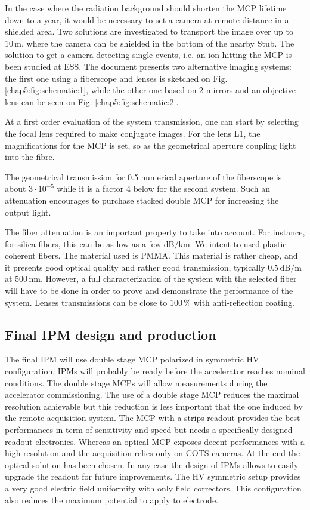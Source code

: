 In the case where the radiation background should shorten the MCP lifetime down to a year, it would be necessary to set a camera at remote distance in a shielded area. Two solutions are investigated to transport the image over up to $10\,\mathrm{m}$, where the camera can be shielded in the bottom of the nearby Stub. The solution to get a camera detecting single events, i.e. an ion hitting the MCP is been studied at ESS. The document presents two alternative imaging systems: the first one using a fiberscope and lenses is sketched on Fig. \ref{chap5:fig:schematic:1}, while the other one based on 2 mirrors and an objective lens can be seen on Fig. \ref{chap5:fig:schematic:2}.



At a first order evaluation of the system transmission, one can start by selecting the focal lens required to make conjugate images. For the lens L1, the magnifications for the MCP is set, so as the geometrical aperture coupling light into the fibre.

The geometrical transmission for 0.5 numerical aperture of the fiberscope is about $3 \cdot 10^{-5}$ while it is a factor 4 below for the second system. Such an attenuation encourages to purchase stacked double MCP for increasing the output light.

The fiber attenuation is an important property to take into account. For instance, for silica fibers, this can be as low as a few $\mathrm{dB/km}$. We intent to used plastic coherent fibers. The material used is PMMA. This material is rather cheap, and it presents good optical quality and rather good transmission, typically $0.5\,\mathrm{dB/m}$ at $500\,\mathrm{nm}$. However, a full characterization of the system with the selected fiber will have to be done in order to prove and demonstrate the performance of the system. Lenses transmissions can be close to $100\,\mathrm{\%}$ with anti-reflection coating.

\subsection*{Final IPM design and production}

The final IPM will use double stage MCP polarized in symmetric HV configuration.
IPMs will probably be ready before the accelerator reaches nominal conditions.
The double stage MCPs will allow measurements during the accelerator commissioning. The use of a double stage MCP reduces the maximal resolution achievable but this reduction is less important that the one induced by the remote acquisition system. The MCP with a strips readout provides the best performances in term of sensitivity and speed but needs a specifically designed readout electronics. Whereas an optical  MCP exposes decent performances with a high resolution and the acquisition relies only on COTS cameras. At the end the optical solution has been chosen. In any case the design of IPMs allows to easily upgrade the readout for future improvements.
The HV symmetric setup provides a very good electric field uniformity with only field correctors. This configuration also reduces the maximum potential to apply to electrode. 

